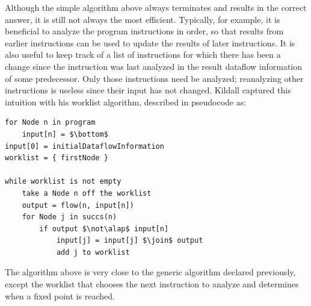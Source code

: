 \documentclass[11pt]{article}
\begin{document}
Although the simple algorithm above always terminates and results in the correct
answer, it is still not always the most efficient.  Typically, for example, it
is beneficial to analyze the program instructions in order, so that results from
earlier instructions can be used to update the results of later instructions.
It is also useful to keep track of a list of instructions for which there has
been a change since the instruction was last analyzed in the result dataflow
information of some predecessor.  Only those instructions need be analyzed;
reanalyzing other instructions is useless since their input has not
changed. Kildall captured this intuition with his worklist algorithm, described
in pseudocode as:

%
%




\begin{lstlisting}[mathescape]
for Node n in program
    input[n] = $\bottom$
input[0] = initialDataflowInformation
worklist = { firstNode }

while worklist is not empty
    take a Node n off the worklist
    output = flow(n, input[n])
	for Node j in succs(n)
		if output $\not\alap$ input[n]
			input[j] = input[j] $\join$ output
			add j to worklist
\end{lstlisting}

\noindent The algorithm above is very close to the generic algorithm declared
previously, except the worklist that chooses the next instruction to analyze
and determines when a fixed point is reached.
\end{document}
